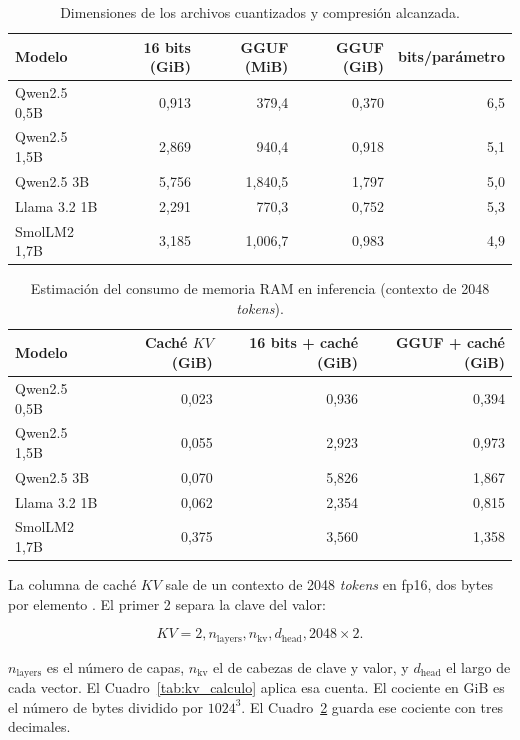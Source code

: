 \begin{table}[H]
\centering
\footnotesize
\caption{Dimensiones de los archivos cuantizados y compresión alcanzada.}
\label{tab:pesos_cuant}
\begin{tabular}{lrrrr}
\toprule
\textbf{Modelo} & \textbf{16 bits (GiB)} & \textbf{GGUF (MiB)} & \textbf{GGUF (GiB)} & \textbf{bits/parámetro} \\
\midrule
Qwen2.5 0,5B & 0,913 & 379,4 & 0,370 & 6,5 \\
Qwen2.5 1,5B & 2,869 & 940,4 & 0,918 & 5,1 \\
Qwen2.5 3B   & 5,756 & 1,840,5 & 1,797 & 5,0 \\
Llama 3.2 1B & 2,291 & 770,3 & 0,752 & 5,3 \\
SmolLM2 1,7B & 3,185 & 1,006,7 & 0,983 & 4,9 \\
\bottomrule
\end{tabular}
\end{table}


\begin{table}[H]
\centering
\footnotesize
\caption{Estimación del consumo de memoria RAM en inferencia (contexto de 2048 \textit{tokens}).}
\label{tab:ram_inferencia}
\begin{tabular}{lrrr}
\toprule
\textbf{Modelo} & \textbf{Caché $KV$ (GiB)} & \textbf{16 bits + caché (GiB)} & \textbf{GGUF + caché (GiB)} \\
\midrule
Qwen2.5 0,5B & 0,023 & 0,936 & 0,394 \\
Qwen2.5 1,5B & 0,055 & 2,923 & 0,973 \\
Qwen2.5 3B   & 0,070 & 5,826 & 1,867 \\
Llama 3.2 1B & 0,062 & 2,354 & 0,815 \\
SmolLM2 1,7B & 0,375 & 3,560 & 1,358 \\
\bottomrule
\end{tabular}
\end{table}

La columna de caché $KV$ sale de un contexto de 2048 \textit{tokens} en fp16, dos bytes por elemento \cite{pope2023efficiently}. El primer 2 separa la clave del valor:

\begin{equation}
KV = 2 , n_{\mathrm{layers}} , n_{\mathrm{kv}} , d_{\mathrm{head}} , 2048 \times 2.
\label{eq:kv_cache}
\end{equation}

$n_{\mathrm{layers}}$ es el número de capas, $n_{\mathrm{kv}}$ el de cabezas de clave y valor, y $d_{\mathrm{head}}$ el largo de cada vector. El Cuadro~\ref{tab:kv_calculo} aplica esa cuenta. El cociente en GiB es el número de bytes dividido por $1024^{3}$. El Cuadro~\ref{tab:ram_inferencia} guarda ese cociente con tres decimales.

